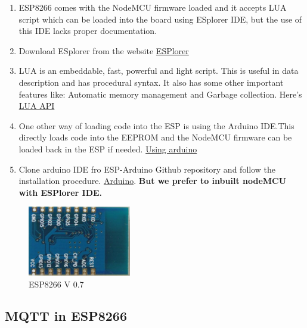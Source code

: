 \documentclass[16pt]{article}
\begin{document}
\begin{enumerate}

\item
  ESP8266 comes with the NodeMCU firmware loaded and it accepts LUA
  script which can be loaded into the board using ESplorer IDE, but the
  use of this IDE lacks proper documentation.
\item
  Download ESplorer from the website \href{http://esp8266.ru/esplorer/#download}{ESPlorer}
\item
  LUA is an embeddable, fast, powerful and light script. This is useful in data
  description and has procedural syntax. It also has some other
  important features like: Automatic memory management and Garbage
  collection. Here's \href{http://www.lua.org/manual/5.3/}{LUA API}
\item
  One other way of loading code into the ESP is using the Arduino
  IDE.This directly loads code into the EEPROM and the NodeMCU firmware
  can be loaded back in the ESP if
  needed. \href{https://learn.adafruit.com/adafruit-huzzah-esp8266-breakout/using-arduino-ide}{Using arduino}
\item Clone
  arduino IDE fro ESP-Arduino Github repository and follow
  the installation procedure. \href{https://github.com/esp8266/Arduino.git}{Arduino}. \textbf{But we prefer to inbuilt nodeMCU with ESPlorer IDE.}
\end{enumerate}


 \begin{figure}
\hspace{3cm}
\includegraphics[width=0.4\textwidth]{images/ESP1.jpg}
\caption{ESP8266 V 0.7}
\end{figure}


\vspace{0.5cm}

\subsection{MQTT in ESP8266}
\end{document}
